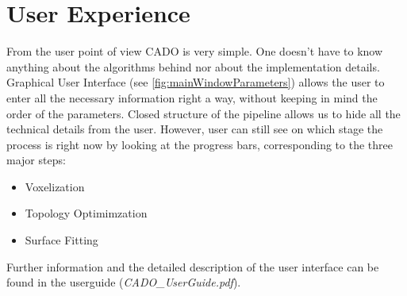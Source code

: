 \section{User Experience}
\label{sec:uex}
From the user point of view CADO  is very simple. One doesn't have to know anything about the algorithms behind nor about the implementation details. Graphical User Interface (see \autoref{fig:mainWindowParameters}) allows the user to enter all the necessary information right a way, without keeping in mind the order of the parameters. Closed structure of the pipeline allows us to hide all the technical details from the user. However, user can still see on which stage the process is right now by looking at the progress bars, corresponding to the three major steps:
\begin{itemize}
\item Voxelization
\item Topology Optimimzation
\item Surface Fitting
\end{itemize}
Further information and the detailed description of the user interface can be found in the userguide (\textit{CADO\_UserGuide.pdf}).